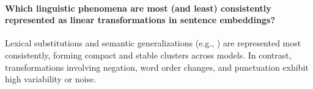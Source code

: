 \begin{mdframed}[
    linecolor=gray,
    linewidth=2pt,
    roundcorner=5,
    backgroundcolor=gray!5
]
\paragraph{Which linguistic phenomena are most (and least) consistently represented as linear transformations in sentence embeddings?} Lexical substitutions and semantic generalizations (e.g., ) are represented most consistently, forming compact and stable clusters across models. In contrast, transformations involving negation, word order changes, and punctuation exhibit high variability or noise. 

\end{mdframed}


       






